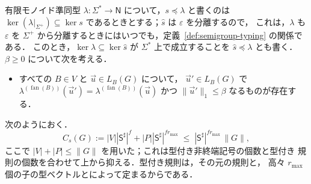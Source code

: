 \documentclass[11pt,a4paper]{ltjsarticle}
\numberwithin{equation}{section}
\theoremstyle{plain}
\theoremstyle{definition}
\theoremstyle{remark}
\newcommand{\tuple}[1]{\vec{#1}}
\newcommand{\eps}{\varepsilon}
\newcommand{\fan}{\operatorname{fan}}
\theoremstyle{plain}
\begin{document}
有限モノイド準同型 $\lambda:\Sigma^*\to\mathsf N$ について，$s\preceq\lambda$ と書くのは
$\ker(\lambda|_{\Sigma^+})\subseteq\ker s$ であるときとする；$\widehat s$ は $\eps$ を分離するので，
これは，$\lambda$ も
$\eps$ を $\Sigma^+$ から分離するときにはいつでも，定義~\ref{def:semigroup-typing} の関係である．
このとき，$\ker\lambda\subseteq\ker\widehat s$ が $\Sigma^*$ 上で成立することを
$\widehat s\preceq\lambda$ とも書く．
$\beta\ge0$ について次を考える．
\begin{itemize}[leftmargin=4em]
\item[$(\mathrm R_\beta^\lambda)$] すべての $B\in V$ と $\tuple u\in L_B(G)$ について，
$\tuple u'\in L_B(G)$ で
$\lambda^{(\fan(B))}(\tuple u')=\lambda^{(\fan(B))}(\tuple u)$ かつ
$\|\tuple u'\|_1\le\beta$ なるものが存在する．
\end{itemize}
次のようにおく．
\[
 C_s(G):=|V||\mathsf S^\sharp|^f+|P||\mathsf S^\sharp|^{fr_{\max}}
 \;\le\;|\mathsf S^\sharp|^{fr_{\max}}\,\|G\|,
\]
ここで $|V|+|P|\le\|G\|$ を用いた；これは型付き非終端記号の個数と型付き
規則の個数を合わせて上から抑える．型付き規則は，その元の規則と，
高々 $r_{\max}$ 個の子の型ベクトルとによって定まるからである．
\end{document}
